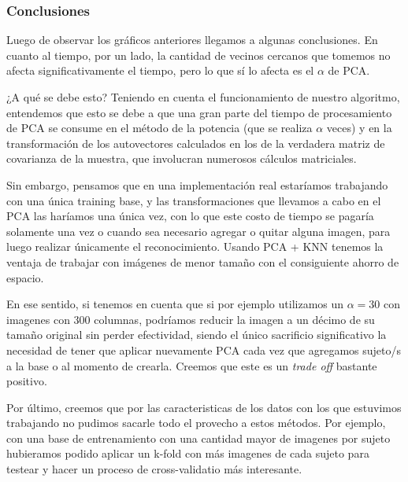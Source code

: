 \subsubsection*{Conclusiones}


Luego de observar los gráficos anteriores llegamos a algunas conclusiones.
En cuanto al tiempo, por un lado, la cantidad de vecinos cercanos que tomemos no afecta significativamente el tiempo, pero lo que sí lo afecta es el $\alpha$ de PCA.

¿A qué se debe esto? Teniendo en cuenta el funcionamiento de nuestro algoritmo, entendemos que esto se debe a que una gran parte del tiempo de procesamiento de PCA se consume en el método de la potencia (que se realiza $\alpha$ veces) y en la transformación de los autovectores calculados en los de la verdadera matriz de covarianza de la muestra, que involucran numerosos cálculos matriciales.\newline

Sin embargo, pensamos que en una implementación real estaríamos trabajando con una única training base, y las transformaciones que llevamos a cabo en el PCA las haríamos una única vez, con lo que este costo de tiempo se pagaría solamente una vez o cuando sea necesario agregar o quitar alguna imagen, para luego realizar únicamente el reconocimiento. Usando PCA + KNN tenemos la ventaja de trabajar con imágenes de menor tamaño con el consiguiente ahorro de espacio.

En ese sentido, si tenemos en cuenta que si por ejemplo utilizamos un $\alpha = 30$ con imagenes con 300 columnas, podríamos reducir la imagen a un décimo de su tamaño original sin perder efectividad, siendo el único sacrificio significativo la necesidad de tener que aplicar nuevamente PCA cada vez que agregamos sujeto/s a la base o al momento de crearla. Creemos que este es un \textit{trade off} bastante positivo.\newline
 
Por último, creemos que por las caracteristicas de los datos con los que estuvimos trabajando no pudimos sacarle todo el provecho a estos métodos. Por ejemplo, con una base de entrenamiento con una cantidad mayor de imagenes por sujeto hubieramos podido aplicar un k-fold con más imagenes de cada sujeto para testear y hacer un proceso de cross-validatio más interesante.